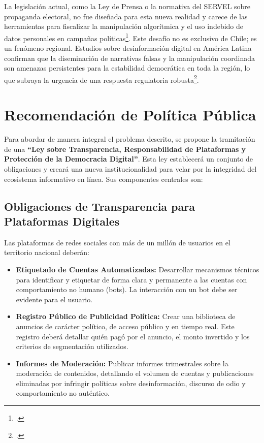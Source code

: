 \documentclass[12pt, letterpaper]{article}
\begin{document}
La legislación actual, como la Ley de Prensa o la normativa del SERVEL sobre propaganda electoral, no fue diseñada para esta nueva realidad y carece de las herramientas para fiscalizar la manipulación algorítmica y el uso indebido de datos personales en campañas políticas\footcite{derechos_digitales_2022}. Este desafío no es exclusivo de Chile; es un fenómeno regional. Estudios sobre desinformación digital en América Latina confirman que la diseminación de narrativas falsas y la manipulación coordinada son amenazas persistentes para la estabilidad democrática en toda la región, lo que subraya la urgencia de una respuesta regulatoria robusta\footcite{renzullo_2023}.

\newpage

\section*{Recomendación de Política Pública}
\thispagestyle{fancy}

Para abordar de manera integral el problema descrito, se propone la tramitación de una \textbf{``Ley sobre Transparencia, Responsabilidad de Plataformas y Protección de la Democracia Digital''}. Esta ley establecerá un conjunto de obligaciones y creará una nueva institucionalidad para velar por la integridad del ecosistema informativo en línea. Sus componentes centrales son:

\subsection{Obligaciones de Transparencia para Plataformas Digitales}
Las plataformas de redes sociales con más de un millón de usuarios en el territorio nacional deberán:
\begin{itemize}[leftmargin=*, itemsep=0.5em]
	\item \textbf{Etiquetado de Cuentas Automatizadas:} Desarrollar mecanismos técnicos para identificar y etiquetar de forma clara y permanente a las cuentas con comportamiento no humano (bots). La interacción con un bot debe ser evidente para el usuario.
	\item \textbf{Registro Público de Publicidad Política:} Crear una biblioteca de anuncios de carácter político, de acceso público y en tiempo real. Este registro deberá detallar quién pagó por el anuncio, el monto invertido y los criterios de segmentación utilizados.
	\item \textbf{Informes de Moderación:} Publicar informes trimestrales sobre la moderación de contenidos, detallando el volumen de cuentas y publicaciones eliminadas por infringir políticas sobre desinformación, discurso de odio y comportamiento no auténtico.
\end{itemize}
\end{document}
